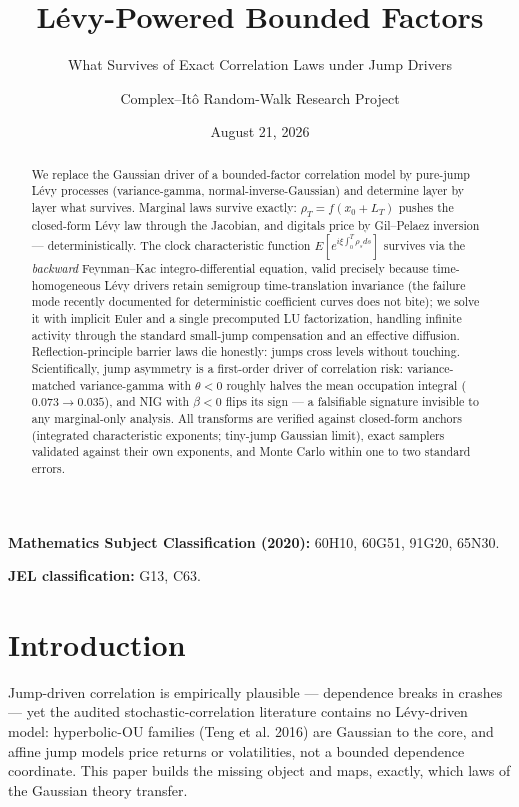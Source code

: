 \documentclass[
  english,
  10pt,
  letterpaper,
  DIV=11,
  numbers=noendperiod]{scrartcl}
\title{Lévy-Powered Bounded Factors}
\subtitle{What Survives of Exact Correlation Laws under Jump Drivers}
\author{Complex--Itô Random-Walk Research Project}
\date{August 21, 2026}
\renewcommand*\contentsname{Table of contents}
\newcommand\contentsname{Table of contents}
\begin{document}
\maketitle
\begin{abstract}
We replace the Gaussian driver of a bounded-factor correlation model by
pure-jump Lévy processes (variance-gamma, normal-inverse-Gaussian) and
determine layer by layer what survives. Marginal laws survive exactly:
\(\rho_T=f(x_0+L_T)\) pushes the closed-form Lévy law through the
Jacobian, and digitals price by Gil--Pelaez inversion ---
deterministically. The clock characteristic function
\(E[e^{i\xi\int_0^T\rho_sds}]\) survives via the \emph{backward}
Feynman--Kac integro-differential equation, valid precisely because
time-homogeneous Lévy drivers retain semigroup time-translation
invariance (the failure mode recently documented for deterministic
coefficient curves does not bite); we solve it with implicit Euler and a
single precomputed LU factorization, handling infinite activity through
the standard small-jump compensation and an effective diffusion.
Reflection-principle barrier laws die honestly: jumps cross levels
without touching. Scientifically, jump asymmetry is a first-order driver
of correlation risk: variance-matched variance-gamma with \(\theta<0\)
roughly halves the mean occupation integral (\(0.073\to0.035\)), and NIG
with \(\beta<0\) flips its sign --- a falsifiable signature invisible to
any marginal-only analysis. All transforms are verified against
closed-form anchors (integrated characteristic exponents; tiny-jump
Gaussian limit), exact samplers validated against their own exponents,
and Monte Carlo within one to two standard errors.
\end{abstract}

\renewcommand*\contentsname{Table of contents}
{
\setcounter{tocdepth}{2}
\tableofcontents
}

\textbf{Mathematics Subject Classification (2020):} 60H10, 60G51, 91G20,
65N30.

\textbf{JEL classification:} G13, C63.

\section{Introduction}\label{sec-introduction}

Jump-driven correlation is empirically plausible --- dependence breaks
in crashes --- yet the audited stochastic-correlation literature
contains no Lévy-driven model: hyperbolic-OU families (Teng et al. 2016)
are Gaussian to the core, and affine jump models price returns or
volatilities, not a bounded dependence coordinate. This paper builds the
missing object and maps, exactly, which laws of the Gaussian theory
transfer.
\end{document}
